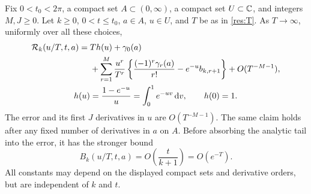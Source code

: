\begin{theorem}
\label{res:main}
Fix $0<t_0<2\pi$, a compact set $A\subset(0,\infty)$, a compact set
$U\subset\mathbb C$, and integers $M,J\geq0$. Let $k\geq0$, $0<t\leq t_0$,
$a\in A$, $u\in U$, and $T$ be as in \eqref{res:T}. As $T\to\infty$,
uniformly over all these choices,
\begin{align}
 \mathcal R_k(u/T,t,a)
  ={}&T h(u)+\gamma_0(a)\notag\\
   &+\sum_{r=1}^{M}\frac{u^r}{T^r}
        \left\{\frac{(-1)^r\gamma_r(a)}{r!}
                  -e^{-u}b_{k,r+1}\right\}
        +O(T^{-M-1}),\label{res:mainformula}\\
 h(u)&=\frac{1-e^{-u}}u=\int_0^1e^{-uv}\,\mathrm d v,\qquad h(0)=1.
 \label{res:h}
\end{align}
The error and its first $J$ derivatives in $u$ are $O(T^{-M-1})$. The same
claim holds after any fixed number of derivatives in $a$ on $A$.
Before absorbing the analytic tail into the error, it has the stronger bound
\begin{equation}\label{res:tailbound}
 B_k(u/T,t,a)=O\!\left(\frac{t}{k+1}\right)=O(e^{-T}).
\end{equation}
All constants may depend on the displayed compact sets and derivative
orders, but are independent of $k$ and $t$.
\end{theorem}

